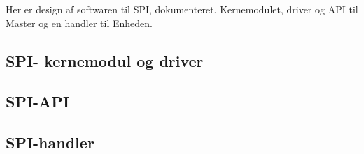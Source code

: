 Her er design af softwaren til SPI, dokumenteret. Kernemodulet, driver og API til Master og en handler til Enheden.


\subsection{SPI- kernemodul og driver}



\subsection{SPI-API}




\subsection{SPI-handler}
